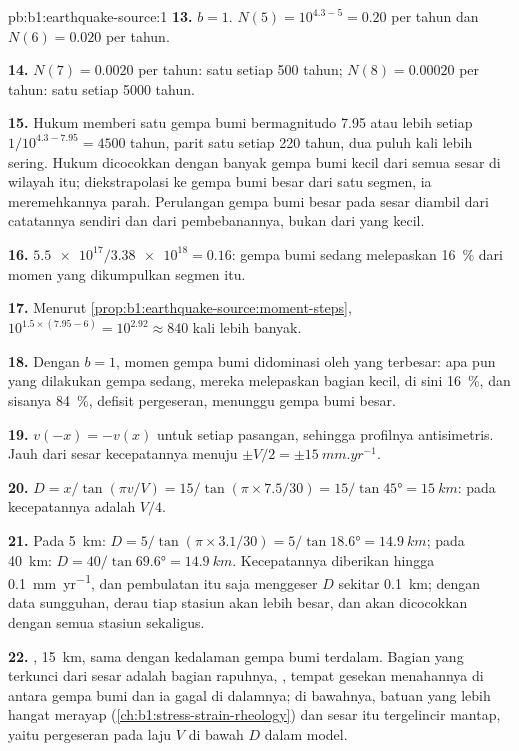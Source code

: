 \begin{solution}{pb:b1:earthquake-source:1}
\textbf{13.} $b = 1$. $N(5) = 10^{4.3 - 5} = 0.20$ per tahun dan $N(6) = 0.020$ per
tahun.

\textbf{14.} $N(7) = 0.0020$ per tahun: satu setiap 500 tahun; $N(8) = 0.00020$ per
tahun: satu setiap \num{5000} tahun.

\textbf{15.} Hukum memberi satu gempa bumi bermagnitudo 7.95 atau lebih setiap
$1/10^{4.3 - 7.95} = \num{4500}$ tahun, parit satu setiap 220 tahun, dua puluh kali lebih
sering. Hukum dicocokkan dengan banyak gempa bumi kecil dari semua sesar di wilayah itu;
diekstrapolasi ke gempa bumi besar dari satu segmen, ia meremehkannya parah. Perulangan
gempa bumi besar pada sesar diambil dari catatannya sendiri dan dari pembebanannya, bukan
dari yang kecil.

\textbf{16.} $\num{5.5e17}/\num{3.38e18} = 0.16$: gempa bumi sedang melepaskan
\qty{16}{\percent} dari momen yang dikumpulkan segmen itu.

\textbf{17.} Menurut \cref{prop:b1:earthquake-source:moment-steps},
$10^{1.5\times(7.95 - 6)} = 10^{2.92} \approx 840$ kali lebih banyak.

\textbf{18.} Dengan $b = 1$, momen gempa bumi didominasi oleh yang terbesar: apa pun yang
dilakukan gempa sedang, mereka melepaskan bagian kecil, di sini \qty{16}{\percent}, dan sisanya
\qty{84}{\percent}, defisit pergeseran, menunggu gempa bumi besar.

\textbf{19.} $v(-x) = -v(x)$ untuk setiap pasangan, sehingga profilnya antisimetris.
Jauh dari sesar kecepatannya menuju $\pm V/2 = \pm\qty{15}{mm.yr^{-1}}$.

\textbf{20.} $D = x/\tan(\pi v/V) = 15/\tan(\pi\times7.5/30) = 15/\tan\ang{45} =
\qty{15}{km}$: pada  kecepatannya adalah $V/4$.

\textbf{21.} Pada \qty{5}{km}: $D = 5/\tan(\pi\times3.1/30) = 5/\tan\ang{18.6} =
\qty{14.9}{km}$; pada \qty{40}{km}: $D = 40/\tan\ang{69.6} = \qty{14.9}{km}$. Kecepatannya
diberikan hingga \qty{0.1}{mm.yr^{-1}}, dan pembulatan itu saja menggeser $D$ sekitar
\qty{0.1}{km}; dengan data sungguhan, derau tiap stasiun akan lebih besar, dan  akan dicocokkan dengan semua stasiun sekaligus.

\textbf{22.} , \qty{15}{km}, sama dengan kedalaman gempa bumi terdalam. Bagian yang terkunci dari sesar adalah bagian rapuhnya, , tempat gesekan menahannya di antara gempa bumi dan ia gagal di dalamnya; di bawahnya, batuan yang lebih hangat merayap (\cref{ch:b1:stress-strain-rheology}) dan sesar itu tergelincir mantap, yaitu pergeseran pada laju $V$ di bawah $D$ dalam model.


\end{solution}
